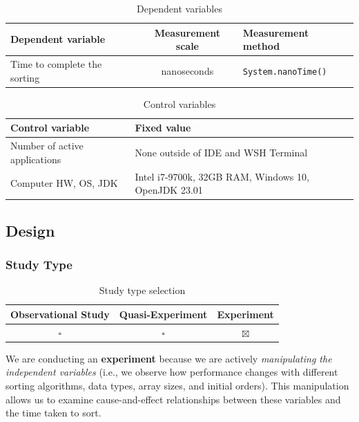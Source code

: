 \documentclass{article}
\begin{document}
    \begin{table}[h!]
        \centering
        \begin{tabular}{l|c|l}
            \textbf{Dependent variable} & \textbf{Measurement scale} & \textbf{Measurement method} \\ 
            \hline
            Time to complete the sorting & nanoseconds & \texttt{System.nanoTime()} \\
        \end{tabular}
        \caption{Dependent variables}
    \end{table}

    \begin{table}[h!]
        \centering
        \begin{tabular}{l|l}
            \textbf{Control variable} & \textbf{Fixed value} \\ \hline
            Number of active applications & None outside of IDE and WSH Terminal \\
            Computer HW, OS, JDK & Intel i7-9700k, 32GB RAM, Windows 10, OpenJDK 23.01 \\ 
        \end{tabular}
        \caption{Control variables}
    \end{table}

    \FloatBarrier

    \subsection{Design}
    \subsubsection{Study Type}
        
        \begin{table}[!h]
            \centering
            \begin{tabular}{c|c|c}
                \textbf{Observational Study} & \textbf{Quasi-Experiment} & \textbf{Experiment} \\ \hline
                \(\square\) & \(\square\) & \(\boxtimes\) \\
            \end{tabular}
            \caption{Study type selection}
        \end{table}

        We are conducting an \textbf{experiment} because we are actively \textit{manipulating the independent variables} (i.e., we observe how performance changes with different sorting algorithms, data types, array sizes, and initial orders). This manipulation allows us to examine cause-and-effect relationships between these variables and the time taken to sort.
\end{document}
